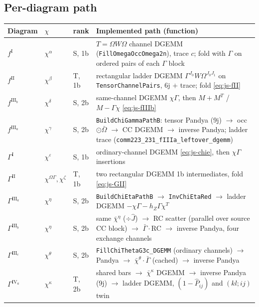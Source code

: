 \documentclass[enabledeprecatedfontcommands]{scrartcl}
\newcommand{\codename}[1]{\texttt{#1}}
\begin{document}
\subsection{Per-diagram path}

\begin{center}
\small
\begin{tabular}{@{}lllp{}@{}}
\hline
Diagram & $\chi$ & rank & Implemented path (function) \\
\hline
$f^{\mathrm{I}}$ & $\chi^\alpha$ & S, 1b &
  $T=\Omega W\Omega$ channel DGEMM (\codename{FillOmegaOccOmega2n}),
  trace $c$; fold with $\Gamma$ on ordered pairs of each $\Gamma$ block \\
$f^{\mathrm{II}}$ & $\chi^\beta$ & T, 1b &
  rectangular ladder DGEMM $\Gamma^{J_0}W\Omega^{J_0J_1}$ on
  \codename{TensorChannelPairs}, 6j $+$ trace; fold \eqref{eq:js-fII} \\
$f^{\mathrm{III}_b}$ & $\chi^\delta$ & S, 2b &
  same-channel DGEMM $\chi\Gamma$, then $M+M^T$ / $M-\Gamma\chi$
  \eqref{eq:js-fIIIb} \\
$f^{\mathrm{III}_a}$ & $\chi^\gamma$ & S, 2b &
  \codename{BuildChiGammaPathB}: tensor Pandya (9j) $\to$ occ $\odot\bar\Omega$
  $\to$ CC DGEMM $\to$ inverse Pandya; ladder trace
  (\codename{comm223\_231\_fIIIa\_leftover\_dgemm}) \\
$\Gamma^{\mathrm{I}}$ & $\chi^\varepsilon$ & S, 1b &
  ordinary-channel DGEMM \eqref{eq:js-chie}, then $\chi\Gamma$ insertions \\
$\Gamma^{\mathrm{II}}$ & $\chi^{\Omega\Gamma},\chi^\zeta$ & T, 1b &
  two rectangular DGEMM 1b intermediates, fold \eqref{eq:js-GII} \\
$\Gamma^{\mathrm{III}_a}$ & $\chi^\eta$ & S, 2b &
  \codename{BuildChiEtaPathB} $\to$ \codename{InvChiEtaRed} $\to$
  ladder DGEMM $-\chi\Gamma-h_Z\Gamma\chi^T$ \\
$\Gamma^{\mathrm{III}_b}$ & $\chi^\eta$ & S, 2b &
  same $\bar\chi^\eta$ ($\div\hat J$) $\to$ RC scatter (parallel over source
  CC block) $\to$ $\bar\Gamma\cdot$RC $\to$ inverse Pandya, four exchange
  channels \\
$\Gamma^{\mathrm{III}_c}$ & $\chi^\theta$ & S, 2b &
  \codename{FillChiThetaG3c\_DGEMM} (ordinary channels) $\to$ Pandya
  $\to$ $\bar\chi^\theta\cdot\bar\Gamma$ (cached) $\to$ inverse Pandya \\
$\Gamma^{\mathrm{IV}_a}$ & $\chi^\kappa$ & T, 2b &
  shared bars $\to$ $\bar\chi^\kappa$ DGEMM $\to$ inverse Pandya (9j) $\to$
  ladder DGEMM, $(1-\hat P_{ij})$ and $(kl;ij)$ twin \\

\end{tabular}
\end{center}
\end{document}
